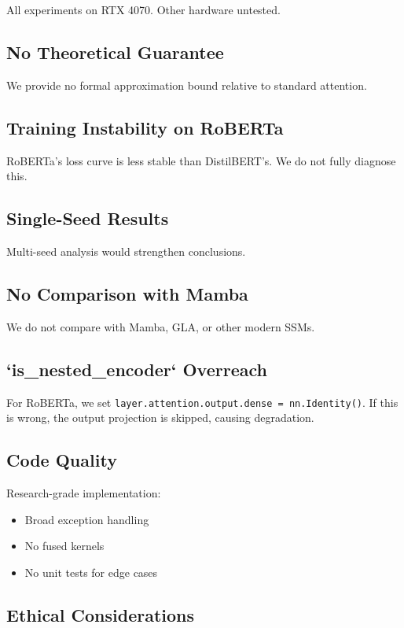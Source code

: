 All experiments on RTX 4070. Other hardware untested.

\subsection{No Theoretical Guarantee}

We provide no formal approximation bound relative to standard attention.

\subsection{Training Instability on RoBERTa}

RoBERTa's loss curve is less stable than DistilBERT's. We do not fully 
diagnose this.

\subsection{Single-Seed Results}

Multi-seed analysis would strengthen conclusions.

\subsection{No Comparison with Mamba}

We do not compare with Mamba, GLA, or other modern SSMs.

\subsection{`is\_nested\_encoder` Overreach}

For RoBERTa, we set \texttt{layer.attention.output.dense = nn.Identity()}. If 
this is wrong, the output projection is skipped, causing degradation.

\subsection{Code Quality}

Research-grade implementation:
\begin{itemize}
\item Broad exception handling
\item No fused kernels
\item No unit tests for edge cases

\end{itemize}
\subsection{Ethical Considerations}

